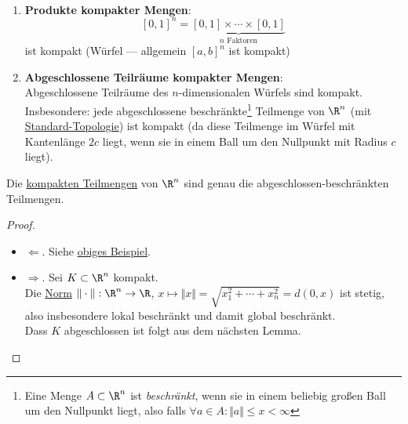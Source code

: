 \begin{example}
  \
  \begin{enumerate}
    \item \textbf{Produkte kompakter Mengen}:
      \begin{equation*}
        {[0,1]}^n = \underbrace{[0,1] \times \cdots \times [0,1]}_{n \text{ Faktoren}}
      \end{equation*}
      ist kompakt (Würfel --- allgemein \( {[a,b]}^n \) ist kompakt) 
    \item \textbf{Abgeschlossene Teilräume kompakter Mengen}\label{bsp:abgeschlosseneTRkompakterMengen}: \\
      Abgeschlossene Teilräume des \( n \)-dimensionalen Würfels sind kompakt. Insbesondere: jede abgeschlossene beschränkte\footnote{Eine Menge \( A \subset \R^n \) ist \emph{beschränkt}, wenn sie in einem beliebig großen Ball um den Nullpunkt liegt, also falls \( \forall a \in A : \Vert a \Vert \leq x < \infty \)} Teilmenge von \( \R^n \) (mit \hyperref[bsp:standardtopologie]{Standard-Topologie}) ist kompakt (da diese Teilmenge im Würfel mit Kantenlänge \( 2c \) liegt, wenn sie in einem Ball um den Nullpunkt mit Radius \( c \) liegt).
  \end{enumerate}
\end{example}

\begin{theorem}
  Die \hyperref[def:kompakt]{kompakten Teilmengen} von \( \R^n \) sind genau die abgeschlossen-beschränkten Teilmengen.
  \begin{proof}
    \
    \begin{itemize}
      \item \( \Leftarrow \). Siehe \hyperref[bsp:abgeschlosseneTRkompakterMengen]{obiges Beispiel}.
      \item \( \Rightarrow \). Sei \( K \subset \R^n \) kompakt. \\
        Die \hyperref[bsp:norm]{Norm} \( \Vert \cdot \Vert : \R^n \to \R \), \( x \mapsto \Vert x \Vert = \sqrt{x_1^2 + \cdots + x_n^2} = d(0,x) \) ist stetig, also insbesondere lokal beschränkt und damit global beschränkt. \\
        Dass \( K \) abgeschlossen ist folgt aus dem nächsten Lemma.
    \end{itemize}
  \end{proof}
\end{theorem}

